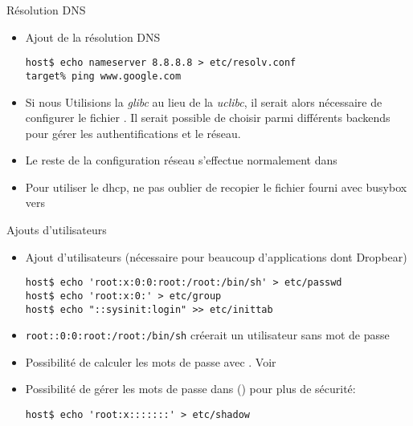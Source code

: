 \begin{frame}[fragile=singleslide]{Résolution DNS}
  \begin{itemize}
  \item Ajout de la résolution DNS
    \begin{lstlisting}
host$ echo nameserver 8.8.8.8 > etc/resolv.conf
target% ping www.google.com
    \end{lstlisting}
  \item  Si nous Utilisions la  \emph{glibc}  au lieu  de  la \emph{uclibc},  il
    serait    alors    nécessaire    de    configurer    le    fichier
    .   Il  serait   possible  de   choisir  parmi
    différents  backends  pour  gérer  les  authentifications  et  le
    réseau.
  \item  Le reste  de la  configuration réseau  s'effectue normalement
    dans 
    \item Pour utiliser le dhcp, ne pas oublier de recopier le fichier 
     fourni avec busybox vers 
  \end{itemize}
\end{frame}

\begin{frame}[fragile=singleslide]{Ajouts d'utilisateurs}
  \begin{itemize}
  \item Ajout d'utilisateurs  (nécessaire pour beaucoup d'applications
    dont Dropbear)
    \begin{lstlisting}
host$ echo 'root:x:0:0:root:/root:/bin/sh' > etc/passwd
host$ echo 'root:x:0:' > etc/group
host$ echo "::sysinit:login" >> etc/inittab 
    \end{lstlisting}
  \item  \verb'root::0:0:root:/root:/bin/sh'  créerait un  utilisateur
    sans mot de passe
    \item Possibilité de calculer les mots de passe avec . Voir 
    \item Possibilité de gérer les mots de passe dans  () pour plus de sécurité:
    \begin{lstlisting}
host$ echo 'root:x:::::::' > etc/shadow
    \end{lstlisting}
  \end{itemize}
\end{frame}

